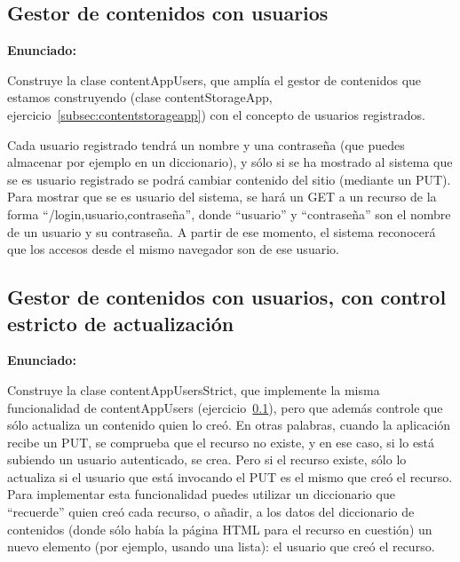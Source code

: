 \subsection{Gestor de contenidos con usuarios}
\label{subsec:contentappusers}

\textbf{Enunciado:}

Construye la clase contentAppUsers, que amplía el gestor de contenidos que estamos construyendo (clase contentStorageApp, ejercicio~\ref{subsec:contentstorageapp}) con el concepto de usuarios registrados.

Cada usuario registrado tendrá un nombre y una contraseña (que puedes almacenar por ejemplo en un diccionario), y sólo si se ha mostrado al sistema que se es usuario registrado se podrá cambiar contenido del sitio (mediante un PUT). Para mostrar que se es usuario del sistema, se hará un GET a un recurso de la forma ``/login,usuario,contraseña'', donde ``usuario'' y ``contraseña'' son el nombre de un usuario y su contraseña. A partir de ese momento, el sistema reconocerá que los accesos desde el mismo navegador son de ese usuario. 

\subsection{Gestor de contenidos con usuarios, con control estricto de actualización}
\label{subsec:contentappusersstrict}

\textbf{Enunciado:}

Construye la clase contentAppUsersStrict, que implemente la misma funcionalidad de contentAppUsers (ejercicio~\ref{subsec:contentappusers}), pero que además controle que sólo actualiza un contenido quien lo creó. En otras palabras, cuando la aplicación recibe un PUT, se comprueba que el recurso no existe, y en ese caso, si lo está subiendo un usuario autenticado, se crea. Pero si el recurso existe, sólo lo actualiza si el usuario que está invocando el PUT es el mismo que creó el recurso. Para implementar esta funcionalidad puedes utilizar un diccionario que ``recuerde'' quien creó cada recurso, o añadir, a los datos del diccionario de contenidos (donde sólo había la página HTML para el recurso en cuestión) un nuevo elemento (por ejemplo, usando una lista): el usuario que creó el recurso.


